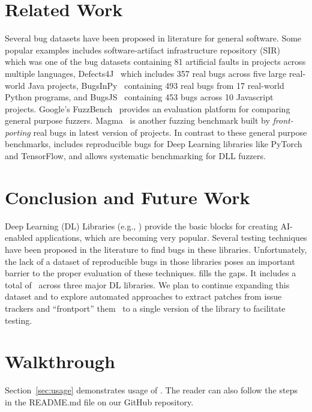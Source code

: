 \documentclass[sigconf,screen]{acmart}
\begin{document}
\section{Related Work} 

Several bug datasets have been proposed in literature for general
software. Some popular examples includes software-artifact
infrastructure repository (SIR)~\cite{do2005supporting} which was one
of the bug datasets containing 81 artificial faults in projects across
multiple languages, Defects4J~\cite{just2014defects4j} which includes
357 real bugs across five large real-world Java projects,
BugsInPy~\cite{widyasari2020bugsinpy} containing 493 real bugs from 17
real-world Python programs, and BugsJS~\cite{vancsics2020relationship}
containing 453 bugs across 10 Javascript projects.
%
Google's FuzzBench~\cite{metzman2021fuzzbench} provides an evaluation platform
for comparing general purpose fuzzers. Magma~\cite{hazimeh2020magma} is another
fuzzing benchmark built by \emph{front-porting} real bugs in latest version of
projects. In contrast to these general purpose benchmarks, \tname includes
reproducible bugs for Deep Learning libraries like PyTorch and TensorFlow, and
allows systematic benchmarking for DLL fuzzers. 


\section{Conclusion and Future Work}
Deep Learning (DL) Libraries (e.g., \torch) provide the basic blocks
for creating AI-enabled applications, which are becoming very
popular. Several testing techniques have been proposed in the
literature to find bugs in these libraries. Unfortunately, the lack of
a dataset of reproducible bugs in those libraries poses an important
barrier to the proper evaluation of these techniques. \tname{} fills
the gaps. It includes a total of \numbugs\ across three major DL
libraries. We plan to continue expanding this dataset and to explore
automated approaches to extract patches from issue trackers and
``frontport'' them~\cite{hazimeh2020magma} to a single version of the
library to facilitate testing.


\balance



\appendix

\section{Walkthrough}

Section~\ref{sec:usage} demonstrates usage of \tname. The reader can
also follow the steps in the README.md file on our GitHub repository.
\end{document}
